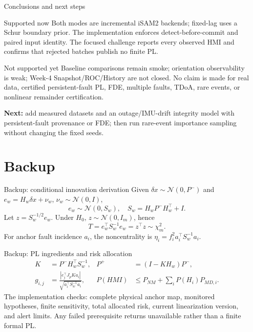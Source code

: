 \documentclass[aspectratio=169,10pt]{beamer}
\begin{document}
\begin{frame}{Conclusions and next steps}
\begin{block}{Supported now}
Both modes are incremental iSAM2 backends; fixed-lag uses a Schur boundary prior. The implementation enforces detect-before-commit and paired input identity. The focused challenge reports every observed HMI and confirms that rejected batches publish no finite PL.
\end{block}
\begin{alertblock}{Not supported yet}
Baseline comparisons remain smoke; orientation observability is weak; Week-4 Snapshot/ROC/History are not closed. No claim is made for real data, certified persistent-fault PL, FDE, multiple faults, TDoA, rare events, or nonlinear remainder certification.
\end{alertblock}
\textbf{Next:} add measured datasets and an outage/IMU-drift integrity model with persistent-fault provenance or FDE; then run rare-event importance sampling without changing the fixed seeds.
\end{frame}

\appendix
\section{Backup}
\begin{frame}{Backup: conditional innovation derivation}
Given $\delta x\sim\mathcal N(0,P^-)$ and $e_w=H_w\delta x+\nu_w$, $\nu_w\sim\mathcal N(0,I)$,
\[
e_w\sim\mathcal N(0,S_w),\quad S_w=H_wP^-H_w^\top+I.
\]
Let $z=S_w^{-1/2}e_w$. Under $H_0$, $z\sim\mathcal N(0,I_m)$, hence
\[
T=e_w^\top S_w^{-1}e_w=z^\top z\sim\chi_m^2.
\]
For anchor fault incidence $a_i$, the noncentrality is $\eta_i=f_i^2a_i^\top S_w^{-1}a_i$.
\end{frame}

\begin{frame}{Backup: PL ingredients and risk allocation}
\small
\begin{align*}
K &= P^-H_w^\top S_w^{-1}, & P^+ &= (I-KH_w)P^-,\\
g_{i,j} &= \frac{|e_j^\top J_pKa_i|}{\sqrt{a_i^\top S_w^{-1}a_i}}, &
P(HMI)&\le P_{NM}+\sum_i P(H_i)P_{MD,i}.
\end{align*}
The implementation checks: complete physical anchor map, monitored hypotheses, finite sensitivity, total allocated risk, current linearization version, and alert limits. Any failed prerequisite returns unavailable rather than a finite formal PL.
\end{frame}
\end{document}
